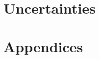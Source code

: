 \documentclass[12pt]{article}
\begin{document}
\section{Uncertainties}
\section{Appendices}
\end{document}

